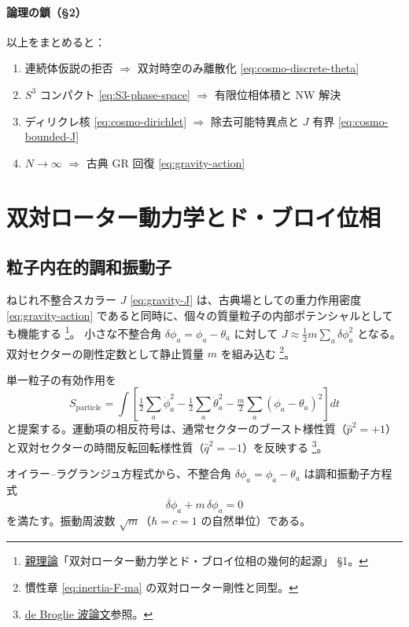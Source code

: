 \documentclass[dvipdfmx,a4paper,oneside]{jsbook}
\numberwithin{equation}{chapter}
\begin{document}
\paragraph{論理の鎖（§2）}
以上をまとめると：
\begin{enumerate}[leftmargin=2em]
  \item 連続体仮説の拒否 \(\Rightarrow\) 双対時空のみ離散化 \eqref{eq:cosmo-discrete-theta}
  \item \(S^3\) コンパクト \eqref{eq:S3-phase-space} \(\Rightarrow\) 有限位相体積と NW 解決
  \item ディリクレ核 \eqref{eq:cosmo-dirichlet} \(\Rightarrow\) 除去可能特異点と \(J\) 有界 \eqref{eq:cosmo-bounded-J}
  \item \(N \to \infty\) \(\Rightarrow\) 古典 GR 回復 \eqref{eq:gravity-action}
\end{enumerate}

\section{双対ローター動力学とド・ブロイ位相}

\subsection{粒子内在的調和振動子}

ねじれ不整合スカラー \(J\) \eqref{eq:gravity-J} は、古典場としての重力作用密度 \eqref{eq:gravity-action} であると同時に、個々の質量粒子の内部ポテンシャルとしても機能する \footnote{\hyperref[sec:sister-manuscripts]{親理論}「双対ローター動力学とド・ブロイ位相の幾何的起源」 §1。}。
小さな不整合角 \(\delta\phi_a = \phi_a - \theta_a\) に対して \(J \approx \tfrac{1}{2} m \sum_a \delta\phi_a^2\) となる。双対セクターの剛性定数として静止質量 \(m\) を組み込む \footnote{慣性章 \eqref{eq:inertia-F-ma} の双対ローター剛性と同型。}。

単一粒子の有効作用を
\begin{equation}
  S_{\mathrm{particle}}
  = \int \left[
    \tfrac{1}{2}\sum_a \dot{\phi}_a^2
    - \tfrac{1}{2}\sum_a \dot{\theta}_a^2
    - \tfrac{m}{2}\sum_a (\phi_a - \theta_a)^2
  \right] dt
  \label{eq:cosmo-particle-action}
\end{equation}
と提案する。運動項の相反符号は、通常セクターのブースト様性質（\(\hat{p}^2 = +1\)）と双対セクターの時間反転回転様性質（\(\hat{q}^2 = -1\)）を反映する \footnote{\hyperref[sec:sister-manuscripts]{de Broglie 波論文}参照。}。

オイラー--ラグランジュ方程式から、不整合角 \(\delta\phi_a = \phi_a - \theta_a\) は調和振動子方程式
\begin{equation}
  \ddot{\delta\phi}_a + m\,\delta\phi_a = 0
  \label{eq:cosmo-harmonic}
\end{equation}
を満たす。振動周波数 \(\sqrt{m}\)（\(\hbar = c = 1\) の自然単位）である。
\end{document}
